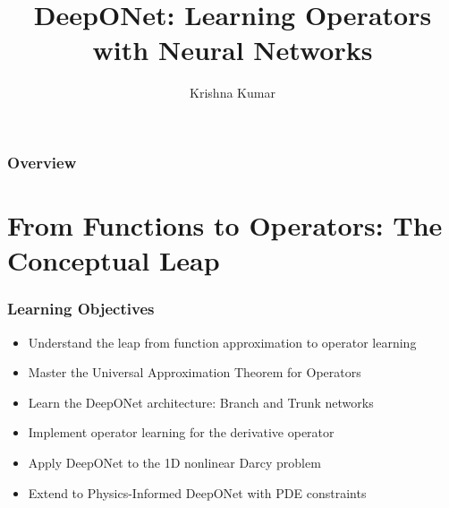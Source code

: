 \documentclass[notes]{beamer}
\title[DeepONet: Operator Learning]{DeepONet: Learning Operators with Neural Networks}
\author{Krishna Kumar} %
\institute[UT Austin] %
{
University of Texas at Austin \\
\medskip
\textit{
  \url{krishnak@utexas.edu}} %
}
\date{} %
\begin{document}
\begin{frame}
\titlepage %
\end{frame}

\begin{frame}
 \frametitle{Overview}
 \tableofcontents
\end{frame}


\section{From Functions to Operators: The Conceptual Leap}

\begin{frame}
\frametitle{Learning Objectives}

\begin{itemize}
    \item Understand the leap from function approximation to operator learning
    \item Master the Universal Approximation Theorem for Operators
    \item Learn the DeepONet architecture: Branch and Trunk networks
    \item Implement operator learning for the derivative operator
    \item Apply DeepONet to the 1D nonlinear Darcy problem
    \item Extend to Physics-Informed DeepONet with PDE constraints
\end{itemize}

\vspace{1cm}
\centering
\href{https://colab.research.google.com/github/kks32-courses/sciml/blob/main/docs/02-deeponet/deeponet.ipynb}{}

\vspace{0.5cm}
\href{https://colab.research.google.com/github/kks32-courses/sciml/blob/main/docs/02-deeponet/pideeponet.ipynb}{}

\end{frame}
\end{document}
